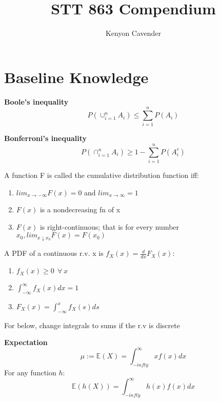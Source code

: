 \documentclass[14pt, oneside, letterpaper, fleqn]{notes}
\begin{document}
\title{STT 863 Compendium}
\author{Kenyon Cavender}
\maketitle

\section*{Baseline Knowledge}

\begin{mydef}
\textbf{Boole's inequality} \\
\[
P(\cup_{i=1}^n A_i ) \leq \sum_{i=1}^n P(A_i)  
\]
\end{mydef}

\begin{mydef}
\textbf{Bonferroni's inequality} \\
\[ 
P(\cap_{i=1}^n A_i ) \geq 1- \sum_{i=1}^n P(A_i^c) 
\]
\end{mydef}

\begin{mydef}
	A function F is called the cumulative distribution
	function iff: 
	\begin{enumerate}
	\item $lim_{x \to -\infty}F(x)=0$ and $lim_{x \to \infty}=1$
	\item $F(x)$ is a nondecreasing fn of x
	\item $F(x)$ is right-continuous; that is for every number 
	$x_0, lim_{x \downarrow x_0} F(x) = F(x_0)$
	\end{enumerate}
\end{mydef}

\begin{mydef}
	A PDF of a continuous r.v. x is $f_X(x)= \frac{d}{dx}F_X(x)$:
	\begin{enumerate}
	\item $f_X(x) \geq 0 \: \: \forall \: x$
	\item $\int_{-\infty}^{\infty}f_X(x)dx = 1$
	\item $F_X(x) = \int_{-\infty}^{x}f_X(s)ds $
	\end{enumerate}
\end{mydef}

For below, change integrals to sums if the r.v is discrete
\begin{mydef}
\textbf{Expectation} \\
\[
\mu := \mathbb{E}(X) = \int_{-infty}^{\infty}xf(x)dx
\] 
For any function $h$:\\
\[
\mathbb{E}(h(X)) = \int_{-infty}^{\infty}h(x)f(x)dx
\]
\end{mydef}
\end{document}
